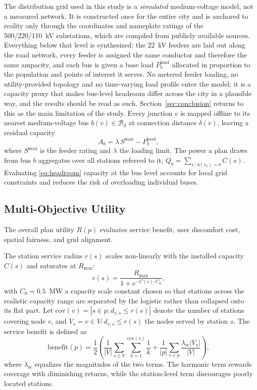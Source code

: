 \documentclass[graybox]{svmult}
\begin{document}
\label{subsec:grid}
The distribution grid used in this study is a \emph{simulated} medium-voltage model, not a measured network. It is constructed once for the entire city and is anchored to reality only through the coordinates and nameplate ratings of the 500/220/110~kV substations, which are compiled from publicly available sources. Everything below that level is synthesized: the 22~kV feeders are laid out along the road network, every feeder is assigned the same conductor and therefore the same ampacity, and each bus is given a base load $P_b^{\mathrm{load}}$ allocated in proportion to the population and points of interest it serves. No metered feeder loading, no utility-provided topology and no time-varying load profile enter the model; it is a capacity proxy that makes bus-level headroom differ across the city in a plausible way, and the results should be read as such. Section~\ref{sec:conclusion} returns to this as the main limitation of the study. Every junction $v$ is mapped offline to its nearest medium-voltage bus $b(v)\in\mathcal{B}_d$ at connection distance $\delta(v)$, leaving a residual capacity
\begin{equation}
\label{eq:headroom}
A_b=\lambda\,S^{\max}-P_b^{\mathrm{load}},
\end{equation}
where $S^{\max}$ is the feeder rating and $\lambda$ the loading limit. The power a plan draws from bus $b$ aggregates over all stations referred to it, $Q_b=\sum_{s\,:\,b(v_s)=b} C(s)$. Evaluating \eqref{eq:headroom} capacity at the bus level accounts for local grid constraints and reduces the risk of overloading individual buses.

\subsection{Multi-Objective Utility}
\label{subsec:utility}
The overall plan utility $R(p)$ evaluates service benefit, user discomfort cost, spatial fairness, and grid alignment.

 The station service radius $r(s)$ scales non-linearly with the installed capacity $C(s)$ and saturates at $R_{\max}$:
\begin{equation}
\label{eq:radius}
r(s)=\frac{R_{\max}}{1+e^{-C(s)/C_0}},
\end{equation}
with $C_0=0.5$~MW a capacity scale constant chosen so that stations across the
realistic capacity range are separated by the logistic rather than collapsed onto
its flat part.
Let $\mathrm{cov}(v)=|{s\in p:d_{v,s}\le r(s)}|$ denote the number of stations covering node $v$, and $V_s={v\in V:d_{v,s}\le r(s)}$ the nodes served by station $s$. The service benefit is defined as
\begin{equation}
\label{eq:benefit}
\mathrm{benefit}(p)=\frac{1}{2}\left(
\frac{1}{|V|}\sum_{v\in V}\sum_{k=1}^{\mathrm{cov}(v)}\frac{1}{k}
+\frac{1}{|p|}\sum_{s\in p}\frac{\lambda_{\mathrm{sc}}|V_s|}{|V|}
\right),
\end{equation}
where $\lambda_{\mathrm{sc}}$ equalizes the magnitudes of the two terms. The harmonic term rewards coverage with diminishing returns, while the station-level term discourages poorly located stations.
\end{document}
